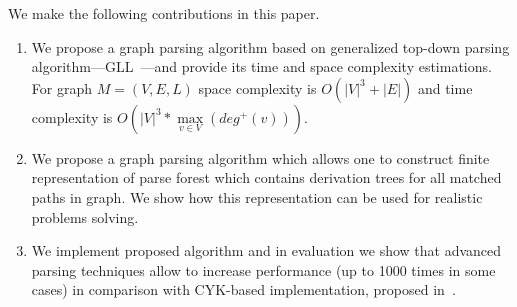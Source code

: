 \documentclass[runningheads,a4paper]{llncs}
\begin{document}
We make the following contributions in this paper.
\begin{enumerate}
\item We propose a graph parsing algorithm based on generalized top-down parsing algorithm---GLL~\cite{scott2010gll}---and provide its time and space complexity estimations. 
For graph $M=(V,E,L)$ space complexity is $O(|V|^3 + |E|)$ and time complexity is $O\left(|V|^3*\max\limits_{v \in V}\left(deg^+\left(v\right)\right)\right)$.
\item We propose a graph parsing algorithm which allows one to construct finite representation of parse forest which contains derivation trees for all matched paths in graph. We show how this representation can be used for realistic problems solving.
\item We implement proposed algorithm and in evaluation we show that advanced parsing techniques allow to increase performance (up to 1000 times in some cases) in comparison with CYK-based implementation, proposed in~\cite{CFGonRDF}.
\end{enumerate}











\end{document}
